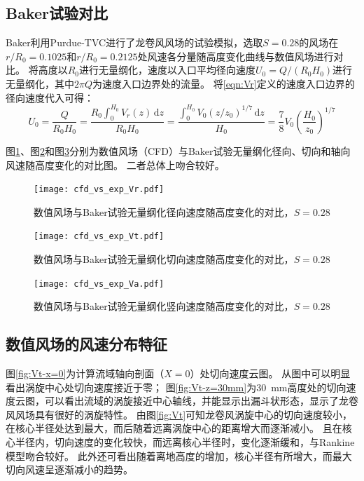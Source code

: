 \subsection{Baker试验对比}
Baker利用Purdue-TVC进行了龙卷风风场的试验模拟\cite{baker1981boundary}，选取$S=0.28$的风场在$r/R_0=0.1025$和$r/R_0=0.2125$处风速各分量随高度变化曲线与数值风场进行对比。
将高度以$R_0$进行无量纲化，速度以入口平均径向速度$U_0=Q/(R_0 H_0)$进行无量纲化，其中$2\pi Q$为速度入口边界处的流量。
将\eqref{eqn:Vr}定义的速度入口边界的径向速度代入可得：
\begin{equation}
	U_0 = \frac{Q}{R_0 H_0} = \frac{R_0 \int_0^{H_0} V_r(z)\,\mathrm{d}z}{R_0 H_0} = \frac{\int_0^{H_0} V_0 (z/z_0)^{1/7}\,\mathrm{d}z}{H_0} = \frac{7}{8} V_0 \left(\frac{H_0}{z_0}\right)^{1/7}
\end{equation}

图\ref{fig:cfd_vs_exp_Vr}、图\ref{fig:cfd_vs_exp_Vt}和图\ref{fig:cfd_vs_exp_Va}分别为数值风场（CFD）与Baker试验无量纲化径向、切向和轴向风速随高度变化的对比图。
二者总体上吻合较好。

\begin{figure}[!htbp]
	\centering
	\texttt{[image: cfd\_vs\_exp\_Vr.pdf]}
	\caption{数值风场与Baker试验无量纲化径向速度随高度变化的对比，$S=0.28$}
	\label{fig:cfd_vs_exp_Vr}
\end{figure}
\begin{figure}[!htbp]
	\centering
	\texttt{[image: cfd\_vs\_exp\_Vt.pdf]}
	\caption{数值风场与Baker试验无量纲化切向速度随高度变化的对比，$S=0.28$}
	\label{fig:cfd_vs_exp_Vt}
\end{figure}
\begin{figure}[!htbp]
	\centering
	\texttt{[image: cfd\_vs\_exp\_Va.pdf]}
	\caption{数值风场与Baker试验无量纲化竖向速度随高度变化的对比，$S=0.28$}
	\label{fig:cfd_vs_exp_Va}
\end{figure}

\subsection{数值风场的风速分布特征}
图\ref{fig:Vt-x=0}为计算流域轴向剖面（$X=0$）处切向速度云图。
从图中可以明显看出涡旋中心处切向速度接近于零；
图\ref{fig:Vt-z=30mm}为\SI{30}{mm}高度处的切向速度云图，可以看出流域的涡旋接近中心轴线，并能显示出漏斗状形态，显示了龙卷风风场具有很好的涡旋特性。
由图\ref{fig:Vt}可知龙卷风涡旋中心的切向速度较小，在核心半径处达到最大，而后随着远离涡旋中心的距离增大而逐渐减小。
且在核心半径内，切向速度的变化较快，而远离核心半径时，变化逐渐缓和，与Rankine模型吻合较好。
此外还可看出随着离地高度的增加，核心半径有所增大，而最大切向风速呈逐渐减小的趋势。

